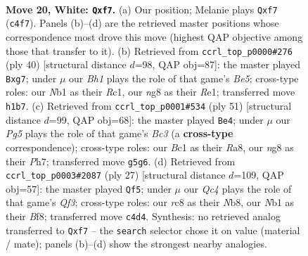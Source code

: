 \documentclass[11pt]{article}
\begin{document}
\clearpage

\begin{figure}[p]\centering
\begin{subfigure}{0.46\textwidth}\centering
\resizebox{\linewidth}{!}{%
\newchessgame
\chessboard[
  setfen={2rk2nr/1b3pp1/pq1b4/2p3Pp/2Q2P1P/2P4R/PP6/RNB1K2B w Q - 0 20},
  showmover=false,
  pgfstyle=straightmove, color=movearrow, markmove={c4-f7}
]}
\caption{}
\end{subfigure}\hfill
\begin{subfigure}{0.46\textwidth}\centering
\resizebox{\linewidth}{!}{%
\newchessgame
\chessboard[
  setfen={r3r1k1/1q1b1pb1/2p3pp/p2pB3/Q2P2PP/2P2P2/P3P1B1/2R1R1K1 w - - 1 21},
  showmover=false,
  pgfstyle=straightmove, color=movearrow, markmove={e5-g7}
]}
\caption{}
\end{subfigure}
\\[4pt]
\begin{subfigure}{0.46\textwidth}\centering
\resizebox{\linewidth}{!}{%
\newchessgame
\chessboard[
  setfen={r3k3/p2p1r1p/qnb1p3/2p2p2/2P2P2/3B4/P2BQRPP/1R4K1 b q - 5 26},
  showmover=false,
  pgfstyle=straightmove, color=movearrow, markmove={c6-e4}
]}
\caption{}
\end{subfigure}\hfill
\begin{subfigure}{0.46\textwidth}\centering
\resizebox{\linewidth}{!}{%
\newchessgame
\chessboard[
  setfen={rn2kb1r/pb3p2/2p1pq1p/1p2P3/2p3QP/2N3B1/PP3PP1/3RKB1R b Kkq - 0 14},
  showmover=false,
  pgfstyle=straightmove, color=movearrow, markmove={f6-f5}
]}
\caption{}
\end{subfigure}
\caption{\textbf{Move 20, White: \texttt{Qxf7}.} (a) Our position; Melanie plays \texttt{Qxf7} (\texttt{c4f7}). Panels (b)--(d) are the retrieved master positions whose correspondence most drove this move (highest QAP objective among those that transfer to it). (b) Retrieved from \texttt{ccrl\_top\_p0000\#276} (ply 40) [structural distance $d$=98, QAP obj=87]: the master played \texttt{Bxg7}; under $\mu$ our \emph{Bh1} plays the role of that game's \emph{Be5}; cross-type roles: our \emph{N}b1 as their \emph{R}c1, our \emph{n}g8 as their \emph{R}e1; transferred move \texttt{h1b7}. (c) Retrieved from \texttt{ccrl\_top\_p0001\#534} (ply 51) [structural distance $d$=99, QAP obj=68]: the master played \texttt{Be4}; under $\mu$ our \emph{Pg5} plays the role of that game's \emph{Bc3} (a \textbf{cross-type} correspondence); cross-type roles: our \emph{B}c1 as their \emph{R}a8, our \emph{n}g8 as their \emph{P}h7; transferred move \texttt{g5g6}. (d) Retrieved from \texttt{ccrl\_top\_p0003\#2087} (ply 27) [structural distance $d$=109, QAP obj=57]: the master played \texttt{Qf5}; under $\mu$ our \emph{Qc4} plays the role of that game's \emph{Qf3}; cross-type roles: our \emph{r}c8 as their \emph{N}b8, our \emph{N}b1 as their \emph{B}f8; transferred move \texttt{c4d4}. Synthesis: no retrieved analog transferred to \texttt{Qxf7} -- the \texttt{search} selector chose it on value (material / mate); panels (b)--(d) show the strongest nearby analogies.}
\label{fig:thought-m38}
\end{figure}
\end{document}
